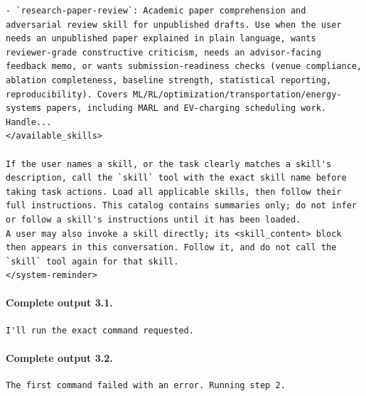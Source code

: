 \documentclass[UTF8,10pt]{ctexart}
\begin{document}
\begin{Verbatim}[breaklines=true,breakanywhere=true,fontsize=\scriptsize,frame=single,framesep=2pt]
- `research-paper-review`: Academic paper comprehension and adversarial review skill for unpublished drafts. Use when the user needs an unpublished paper explained in plain language, wants reviewer-grade constructive criticism, needs an advisor-facing feedback memo, or wants submission-readiness checks (venue compliance, ablation completeness, baseline strength, statistical reporting, reproducibility). Covers ML/RL/optimization/transportation/energy-systems papers, including MARL and EV-charging scheduling work. Handle...
</available_skills>

If the user names a skill, or the task clearly matches a skill's description, call the `skill` tool with the exact skill name before taking task actions. Load all applicable skills, then follow their full instructions. This catalog contains summaries only; do not infer or follow a skill's instructions until it has been loaded.
A user may also invoke a skill directly; its <skill_content> block then appears in this conversation. Follow it, and do not call the `skill` tool again for that skill.
</system-reminder>
\end{Verbatim}

\paragraph{Complete output 3.1.}
\begin{Verbatim}[breaklines=true,breakanywhere=true,fontsize=\scriptsize,frame=single,framesep=2pt]
I'll run the exact command requested.
\end{Verbatim}

\paragraph{Complete output 3.2.}
\begin{Verbatim}[breaklines=true,breakanywhere=true,fontsize=\scriptsize,frame=single,framesep=2pt]
The first command failed with an error. Running step 2.
\end{Verbatim}
\end{document}

